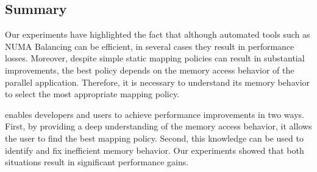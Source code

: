 \subsection{Summary}

Our experiments have highlighted the fact that although automated tools such
as NUMA Balancing can be efficient, in several cases they result in
performance losses. Moreover, despite simple static mapping policies
can result in substantial improvements, the best policy depends on the memory access behavior of the parallel application. Therefore, it is necessary to understand its memory behavior to
select the most appropriate mapping policy.

\TABARNAC enables developers and users to achieve performance improvements in two ways. First, by
providing a deep understanding of the memory access behavior, it allows the user to
find the best mapping policy. Second, this knowledge can be used to
identify and fix inefficient memory behavior. Our experiments showed that both
situations result in significant performance gains.
